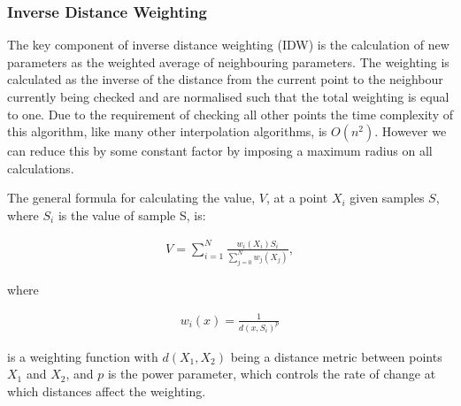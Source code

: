         \subsubsection{Inverse Distance Weighting}\label{background_interpolation_methods_inversedistanceweighting}

            The key component of inverse distance weighting (IDW) is the calculation of new parameters as the weighted average of neighbouring parameters. The weighting is calculated as the inverse of the distance from the current point to the neighbour currently being checked and are normalised such that the total weighting is equal to one. Due to the requirement of checking all other points the time complexity of this algorithm, like many other interpolation algorithms, is $O(n^{2})$. However we can reduce this by some constant factor by imposing a maximum radius on all calculations. 

            The general formula for calculating the value, $V$, at a point $X_{i}$ given samples $S$, where $S_{i}$ is the value of sample S, is:

            \begin{align*}
                V = \sum_{i=1}^{N}{
                        \frac{
                            w_{i}(X_{i})S_{i}
                        }{
                            \sum_{j=0}^{N}{w_{j}(X_{j})}
                        }
                    },
            \end{align*}

            where 

            \begin{align*}
                w_{i}(x) = \frac{1}{d(x,S_{i})^{p}}
            \end{align*}

            is a weighting function with $d(X_{1},X_{2})$ being a distance metric between points $X_{1}$ and $X_{2}$, and $p$ is the power parameter, which controls the rate of change at which distances affect the weighting.

